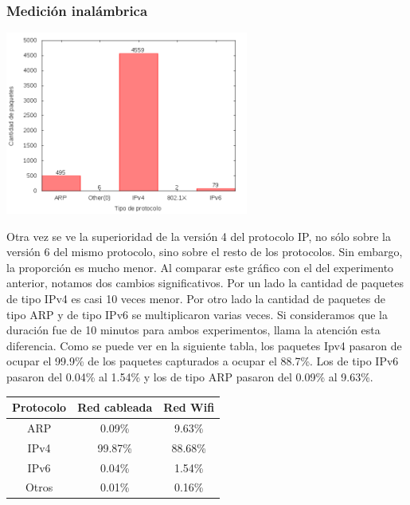 \subsubsection{Medición inalámbrica}

\begin{center}
\includegraphics[width=8cm]{../mediciones/home-wfi-10/home-wfi-10Protocolos.png}
\end{center}

Otra vez se ve la superioridad de la versión 4 del protocolo IP, no sólo sobre la versión 6 del mismo protocolo, sino sobre el resto de los protocolos.
Sin embargo, la proporción es mucho menor. Al comparar este gráfico con el del experimento anterior, notamos dos cambios significativos. Por un lado la cantidad
de paquetes de tipo IPv4 es casi 10 veces menor. Por otro lado la cantidad de paquetes de tipo ARP y de tipo IPv6 se multiplicaron varias veces. Si consideramos
que la duración fue de 10 minutos para ambos experimentos, llama la atención esta diferencia. Como se puede ver en la siguiente tabla, los paquetes Ipv4 pasaron
de ocupar el 99.9\% de los paquetes capturados a ocupar el 88.7\%. Los de tipo IPv6 pasaron del 0.04\% al 1.54\% y los de tipo ARP pasaron del 0.09\% al 9.63\%.

\begin{center}
\begin{tabular}{|c||c|c|}
\hline
Protocolo & Red cableada & Red Wifi \\
\hline
ARP & 0.09\% & 9.63\% \\
\hline
IPv4 & 99.87\% & 88.68\% \\
\hline
IPv6 & 0.04\% & 1.54\% \\
\hline
Otros & 0.01\% & 0.16\% \\
\hline
\end{tabular}
\end{center}


